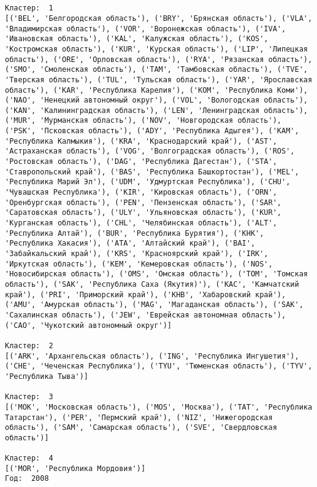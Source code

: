 \documentclass[11pt]{article}
\begin{document}
    \begin{center}
    \end{center}
    { \hspace*{\fill} \\}
    
    \begin{Verbatim}[commandchars=\\\{\}]

Кластер:  1
[('BEL', 'Белгородская область'), ('BRY', 'Брянская область'), ('VLA', 'Владимирская область'), ('VOR', 'Воронежская область'), ('IVA', 'Ивановская область'), ('KAL', 'Калужская область'), ('KOS', 'Костромская область'), ('KUR', 'Курская область'), ('LIP', 'Липецкая область'), ('ORE', 'Орловская область'), ('RYA', 'Рязанская область'), ('SMO', 'Смоленская область'), ('TAM', 'Тамбовская область'), ('TVE', 'Тверская область'), ('TUL', 'Тульская область'), ('YAR', 'Ярославская область'), ('KAR', 'Республика Карелия'), ('KOM', 'Республика Коми'), ('NAO', 'Ненецкий автономный округ'), ('VOL', 'Вологодская область'), ('KAN', 'Калинингpадская область'), ('LEN', 'Ленинградская область'), ('MUR', 'Мурманская область'), ('NOV', 'Новгородская область'), ('PSK', 'Псковская область'), ('ADY', 'Республика Адыгея'), ('KAM', 'Республика Калмыкия'), ('KRA', 'Краснодарский край'), ('AST', 'Астраханская область'), ('VOG', 'Волгоградская область'), ('ROS', 'Ростовская область'), ('DAG', 'Республика Дагестан'), ('STA', 'Ставропольский край'), ('BAS', 'Республика Башкортостан'), ('MEL', 'Республика Марий Эл'), ('UDM', 'Удмуртская Республика'), ('CHU', 'Чувашская Республика'), ('KIR', 'Кировская область'), ('ORN', 'Оренбургская область'), ('PEN', 'Пензенская область'), ('SAR', 'Саратовская область'), ('ULY', 'Ульяновская область'), ('KUR', 'Курганская область'), ('CHL', 'Челябинская область'), ('ALT', 'Республика Алтай'), ('BUR', 'Республика Бурятия'), ('KHK', 'Республика Хакасия'), ('ATA', 'Алтайский край'), ('BAI', 'Забайкальский край'), ('KRS', 'Красноярский край'), ('IRK', 'Иркутская область'), ('KEM', 'Кемеровская область'), ('NOS', 'Новосибирская область'), ('OMS', 'Омская область'), ('TOM', 'Томская область'), ('SAK', 'Республика Саха (Якутия)'), ('KAC', 'Камчатский край'), ('PRI', 'Приморский край'), ('KHB', 'Хабаровский край'), ('AMU', 'Амурская область'), ('MAG', 'Магаданская область'), ('SAK', 'Сахалинская область'), ('JEW', 'Еврейская автономная область'), ('CAO', 'Чукотский автономный округ')]

Кластер:  2
[('ARK', 'Архангельская область'), ('ING', 'Республика Ингушетия'), ('CHE', 'Чеченская Республика'), ('TYU', 'Тюменская область'), ('TYV', 'Республика Тыва')]

Кластер:  3
[('MOK', 'Московская область'), ('MOS', 'Москва'), ('TAT', 'Республика Татарстан'), ('PER', 'Пермский край'), ('NIZ', 'Нижегородская область'), ('SAM', 'Самарская область'), ('SVE', 'Свердловская область')]

Кластер:  4
[('MOR', 'Республика Мордовия')]
Год:  2008

    \end{Verbatim}
\end{document}
